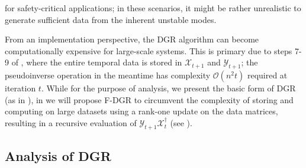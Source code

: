 \documentclass[journal]{IEEEtran}
\theoremstyle{definition}
\theoremstyle{remark}
\begin{document}
for safety-critical applications; in these scenarios, it might be rather
unrealistic to generate sufficient data from the inherent unstable modes.

From an implementation perspective, the \ac{DGR} algorithm can become 
computationally expensive for large-scale systems.
%
This is primary due to steps 7-9 of , where the entire temporal data is stored in $\mathcal{X}_{t+1}$ and $\mathcal{Y}_{t+1}$;
the pseudoinverse operation in the meantime has 
complexity $\mathcal{O}(n^2t)$ required at iteration $t$.
%
{\color{PineGreen} While for the purpose of analysis, we present the basic form of \ac{DGR} (as in ), in  we will propose \ac{F-DGR} to circumvent the complexity of storing and computing on large datasets using a rank-one update on the data matrices, resulting in a recursive evaluation of $\mathcal{Y}_{t+1} \mathcal{X}_{t}^{\dagger}$ (see ). 
}
%
\subsection{Analysis of DGR}
\label{sec:results}
    
\end{document}
